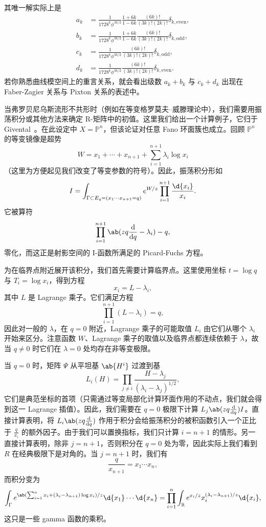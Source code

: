 \documentclass{amsart}
\theoremstyle{definition}
\theoremstyle{remark}
\theoremstyle{plain}
\theoremstyle{definition}
\theoremstyle{remark}
\newcommand{\R}{\mathbb{R}}
\renewcommand{\P}{\mathbb{P}}
\newcommand{\1}{\mathbf{1}}
\newcommand{\2}{\mathbf{2}}
\newcommand{\3}{\mathbf{3}}
\begin{document}
其唯一解实际上是
\begin{align*}
    a_k &= \frac{1}{1728^k \phi^{3k/2}} \frac{1+6k}{1-6k} \frac{(6k)!}{(3k)!(2k)!} \delta_{k, \text{even}},  \\
    b_k &= \frac{1}{1728^k \phi^{3k/2}} \frac{1+6k}{1-6k}\frac{(6k)!}{(3k)!(2k)!} \delta_{k, \text{odd}},  \\
    c_k &= \frac{1}{1728^k \phi^{3k/2}}\frac{(6k)!}{(3k)!(2k)!} \delta_{k, \text{odd}}, \\
    d_k &= \frac{1}{1728^k \phi^{3k/2}} \frac{(6k)!}{(3k)!(2k)!} \delta_{k, \text{even}}. 
\end{align*}
若你熟悉曲线模空间上的重言关系，就会看出级数 \(a_k + b_k\) 与 \(c_k + d_k\) 出现在 Faber-Zagier 关系与 Pixton 关系的表述中。

当弗罗贝尼乌斯流形不共形时（例如在等变格罗莫夫–威滕理论中），我们需要用振荡积分或其他方法来确定 R-矩阵中的初值。这里我们给出一个计算例子，它归于 Givental~\cite{Givental2001semisimple}。在此设定中 \(X = \P^n\)，但该论证对任意 Fano 环面簇也成立。回顾 \(\P^n\) 的等变镜像是超势
\[ W = x_1 + \cdots + x_{n+1} + \sum_{i=1}^{n+1} \lambda_i \log x_i \]
（这里为方便起见我们改变了等变参数的符号）。因此，振荡积分形如
\[ I = \int_{\Gamma \subset E_q = (x_1 \cdots x_{n+1}=q)} e^{W/z} \prod_{i=1}^{n+1} \frac{\d{x_i}}{x_i}. \]
它被算符
\[ \prod_{i=1}^{n+1}\ab(zq \odv{}{q} -\lambda_i) - q, \]
零化，而这正是射影空间的 I-函数所满足的 Picard-Fuchs 方程。

为在临界点附近展开该积分，我们首先需要计算临界点。这里使用坐标 \(t = \log q\) 与 \(T_i = \log x_i\)，得到方程
\[ x_i = L - \lambda_i, \]
其中 \(L\) 是 Lagrange 乘子。它们满足方程
\[ \prod_{i=1}^{n+1} (L - \lambda_i) = q, \]
因此对一般的 \(\lambda\)，在 \(q = 0\) 附近，Lagrange 乘子的可能取值 \(L_i\) 由它们从哪个 \(\lambda_i\) 开始来区分。注意函数 \(W\)、Lagrange 乘子的取值以及临界点都连续依赖于 \(\lambda\)，故当 \(q \neq 0\) 时它们在 \(\lambda = 0\) 处均存在非等变极限。

当 \(q = 0\) 时，矩阵 \(\Psi\) 从平坦基 \(\ab{H^i}\) 过渡到基
\[ L_i(H) = \prod_{j \neq i} \frac{H - \lambda_j}{(\lambda_i - \lambda_j)^{1/2}}, \]
它们是典范坐标的首项（只需通过等变局部化计算环面作用的不动点，我们就会得到这一 Lagrange 插值）。因此，我们需要在 \(q = 0\) 极限下计算 \(L_j \ab(z q \odv{}{q}) I\)。直接计算表明，将 \(L_i \ab(z q \odv{}{q})\) 作用于积分会给振荡积分的被积函数引入一个正比于 \(\frac{q}{x_i}\) 的额外因子。由于我们可以置换指标，我们只计算 \(i = n+1\) 的情形。另一直接计算表明，除非 \( j = n+1\)，否则积分在 \(q = 0\) 处为零，因此实际上我们看到 \(R\) 在经典极限下是对角的。当 \(j = n+1\) 时，我们有
\[ \frac{q}{x_{n+1}} = x_1 \cdots x_n, \]
而积分变为
\[ \int_{\Gamma} e^{\ab( \sum_{i=1}^n x_i + (\lambda_i - \lambda_{n+1})\log x_i ) / z} \d{x_1} \cdots \d{x_n} = \prod_{i=1}^n \int_{\R} e^{x_i/z} x_i^{(\lambda_i - \lambda_{n+1})/z} \d{x_i}, \]
这只是一些 gamma 函数的乘积。
\end{document}
